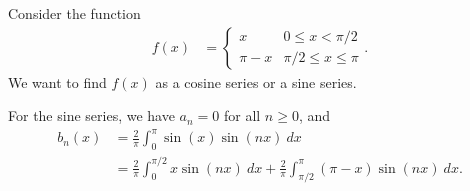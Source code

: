 \documentclass[10pt]{mypackage}
\begin{document}
\begin{example}
  Consider the function
  \begin{align*}
    f(x) &= \begin{cases}
      x & 0 \leq x < \pi/2\\
      \pi-x & \pi/2 \leq x \leq \pi
    \end{cases}.
  \end{align*}
  We want to find $f(x)$ as a cosine series or a sine series.\newline

  For the sine series, we have $a_n = 0$ for all $n\geq 0$, and
  \begin{align*}
    b_n(x) &= \frac{2}{\pi}\int_{0}^{\pi} \sin(x)\sin\left( nx \right)\:dx\\
           &= \frac{2}{\pi}\int_{0}^{\pi/2} x\sin\left( nx \right)\:dx + \frac{2}{\pi} \int_{\pi/2}^{\pi} \left( \pi - x \right)\sin\left( nx \right)\:dx.
  \end{align*}
\end{example}
\end{document}
